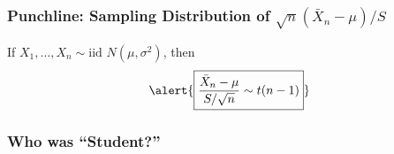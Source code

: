 \documentclass[handout]{beamer}
\begin{document}
\begin{frame}
\frametitle{Punchline: Sampling Distribution of $\sqrt{n}(\bar{X}_n-\mu)/S$}
If $X_1, \hdots, X_n \sim \mbox{iid } N(\mu,\sigma^2)$, then
	$$\alert{\boxed{\frac{\bar{X}_n - \mu}{S/\sqrt{n}} \sim t(n-1)}}$$
\end{frame}
\begin{frame}
\frametitle{Who was ``Student?''}
\framesubtitle{\href{http://www.aeaweb.org/articles.php?doi=10.1257/jep.22.4.199}{}}

\begin{columns}

\begin{figure}
\vspace{0.75em}


\end{figure}
\end{columns}
\end{frame}
\end{document}
